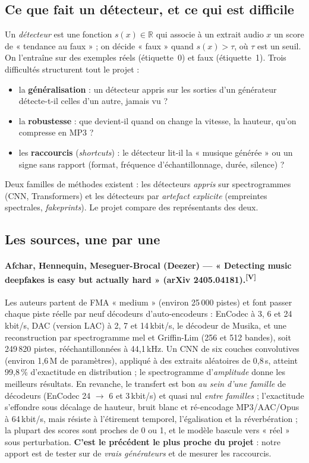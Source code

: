 \documentclass[10pt,a4paper]{article}
\newcommand{\sV}{\textsuperscript{\scriptsize\textcolor{green!40!black}{[V]}}}
\begin{document}
\subsection{Ce que fait un détecteur, et ce qui est difficile}
Un \emph{détecteur} est une fonction $s(x)\in\mathbb{R}$ qui associe à un extrait audio $x$ un score de « tendance au faux » ; on décide « faux » quand $s(x)>\tau$, où $\tau$ est un seuil. On l'entraîne sur des exemples réels (étiquette~0) et faux (étiquette~1). Trois difficultés structurent tout le projet :
\begin{itemize}
  \item la \textbf{généralisation} : un détecteur appris sur les sorties d'un générateur détecte-t-il celles d'un autre, jamais vu ?
  \item la \textbf{robustesse} : que devient-il quand on change la vitesse, la hauteur, qu'on compresse en MP3 ?
  \item les \textbf{raccourcis} (\emph{shortcuts}) : le détecteur lit-il la « musique générée » ou un signe sans rapport (format, fréquence d'échantillonnage, durée, silence) ?
\end{itemize}
Deux familles de méthodes existent : les détecteurs \emph{appris} sur spectrogrammes (CNN, Transformers) et les détecteurs par \emph{artefact explicite} (empreintes spectrales, \emph{fakeprints}). Le projet compare des représentants des deux.

\subsection{Les sources, une par une}
\paragraph{Afchar, Hennequin, Meseguer-Brocal (Deezer) --- « Detecting music deepfakes is easy but actually hard » (arXiv 2405.04181).\sV}
Les auteurs partent de FMA « medium » (environ 25\,000 pistes) et font passer chaque piste réelle par neuf décodeurs d'auto-encodeurs : EnCodec à 3, 6 et 24\,kbit/s, DAC (version LAC) à 2, 7 et 14\,kbit/s, le décodeur de Musika, et une reconstruction par spectrogramme mel et Griffin-Lim (256 et 512 bandes), soit 249\,820 pistes, rééchantillonnées à 44,1\,kHz. Un CNN de six couches convolutives (environ 1,6\,M de paramètres), appliqué à des extraits aléatoires de 0,8\,s, atteint 99,8\,\% d'exactitude en distribution ; le spectrogramme d'\emph{amplitude} donne les meilleurs résultats. En revanche, le transfert est bon \emph{au sein d'une famille} de décodeurs (EnCodec 24 $\to$ 6 et 3\,kbit/s) et quasi nul \emph{entre familles} ; l'exactitude s'effondre sous décalage de hauteur, bruit blanc et ré-encodage MP3/AAC/Opus à 64\,kbit/s, mais résiste à l'étirement temporel, l'égalisation et la réverbération ; la plupart des scores sont proches de 0 ou 1, et le modèle bascule vers « réel » sous perturbation. \textbf{C'est le précédent le plus proche du projet} : notre apport est de tester sur de \emph{vrais générateurs} et de mesurer les raccourcis.
\end{document}
